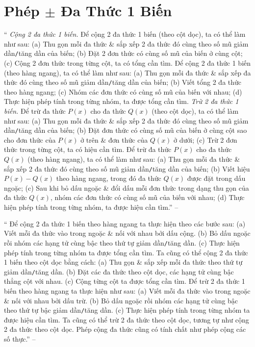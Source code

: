 \documentclass{article}
\begin{document}
\section{Phép $\pm$ Đa Thức 1 Biến}
`` \textit{Cộng 2 đa thức 1 biến.} Để cộng 2 đa thức 1 biến (theo cột dọc), ta có thể làm như sau: (a) Thu gọn mỗi đa thức \& sắp xếp 2 đa thức đó cùng theo số mũ giảm dần\texttt{/}tăng dần của biến; (b) Đặt 2 đơn thức có cùng số mũ của biến ở cùng cột; (c) Cộng 2 đơn thức trong từng cột, ta có tổng cần tìm. Để cộng 2 đa thức 1 biến (theo hàng ngang), ta có thể làm như sau: (a) Thu gọn mỗi đa thức \& sắp xếp đa thức đó cùng theo số mũ giảm dần\texttt{/}tăng dần của biến; (b) Viết tổng 2 đa thức theo hàng ngang; (c) Nhóm các đơn thức có cùng số mũ của biến với nhau; (d) Thực hiện phép tính trong từng nhóm, ta được tổng cần tìm.  \textit{Trừ 2 đa thức 1 biến.} Để trừ đa thức $P(x)$ cho đa thức $Q(x)$ (theo cột dọc), ta có thể làm như sau: (a) Thu gọn mỗi đa thức \& sắp xếp 2 đa thức đó cùng theo số mũ giảm dần\texttt{/}tăng dần của biến; (b) Đặt đơn thức có cùng số mũ của biến ở cùng cột sao cho đơn thức của $P(x)$ ở trên \& đơn thức của $Q(x)$ ở dưới; (c) Trừ 2 đơn thức trong từng cột, ta có hiệu cần tìm. Để trừ đa thức $P(x)$ cho đa thức $Q(x)$ (theo hàng ngang), ta có thể làm như sau: (a) Thu gọn mỗi đa thức \& sắp xếp 2 đa thức đó cùng theo số mũ giảm dần\texttt{/}tăng dần của biến; (b) Viết hiệu $P(x) - Q(x)$ theo hàng ngang, trong đó đa thức $Q(x)$ được đặt trong dấu ngoặc; (c) Sau khi bỏ dấu ngoặc \& đổi dấu mỗi đơn thức trong dạng thu gọn của đa thức $Q(x)$, nhóm các đơn thức có cùng số mũ của biến với nhau; (d) Thực hiện phép tính trong từng nhóm, ta được hiệu cần tìm.'' -- \cite[\S3, pp. 44--45]{SBT_Toan_7_Canh_Dieu_tap_2}

`` Để cộng 2 đa thức 1 biến theo hàng ngang ta thực hiện theo các bước sau: (a) Viết mỗi đa thức vào trong ngoặc \& nối với nhau bởi dấu cộng. (b) Bỏ dấu ngoặc rồi nhóm các hạng tử cùng bậc theo thứ tự giảm dần\texttt{/}tăng dần. (c) Thực hiện phép tính trong từng nhóm ta được tổng cần tìm. Ta cũng có thể cộng 2 đa thức 1 biến theo cột dọc bằng cách: (a) Thu gọn \& sắp xếp mỗi đa thức theo thứ tự giảm dần\texttt{/}tăng dần. (b) Đặt các đa thức theo cột dọc, các hạng tử cùng bậc thẳng cột với nhau. (c) Cộng từng cột ta được tổng cần tìm.  Để trừ 2 đa thức 1 biến theo hàng ngang ta thực hiện như sau: (a) Viết mỗi đa thức vào trong ngoặc \& nối với nhau bởi dấu trừ. (b) Bỏ dấu ngoặc rồi nhóm các hạng tử cùng bậc theo thứ tự bậc giảm dần\texttt{/}tăng dần. (c) Thực hiện phép tính trong từng nhóm ta được hiệu cần tìm. Ta cũng có thể trừ 2 đa thức theo cột dọc, tương tự như cộng 2 đa thức theo cột dọc.  Phép cộng đa thức cũng có tính chất như phép cộng các số thực.'' -- \cite[Chap. III, \S3, p. 42]{Tuyen_Toan_7}
\end{document}
